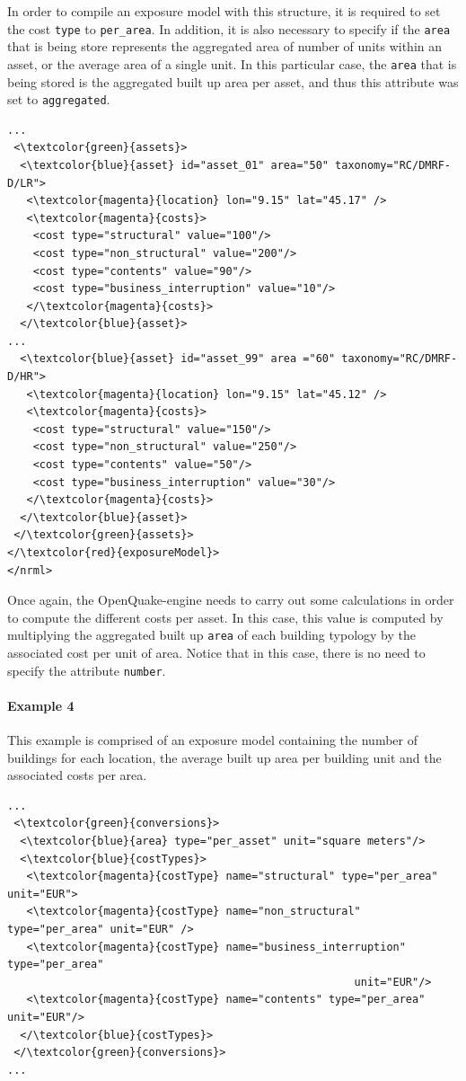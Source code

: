 In order to compile an \gls{exposure model} with this structure, it is required to set the cost \Verb+type+ to \Verb+per_area+. In addition, it is also necessary to specify if the \Verb+area+ that is being store represents the aggregated area of number of units within an asset, or the average area of a single unit. In this particular case, the \Verb+area+ that is being stored is the aggregated built up area per asset, and thus this attribute was set to \Verb+aggregated+.

\begin{Verbatim}[frame=single, commandchars=\\\{\}, samepage=false]
...
 <\textcolor{green}{assets}>
  <\textcolor{blue}{asset} id="asset_01" area="50" taxonomy="RC/DMRF-D/LR">
   <\textcolor{magenta}{location} lon="9.15" lat="45.17" />
   <\textcolor{magenta}{costs}>
    <cost type="structural" value="100"/>
    <cost type="non_structural" value="200"/>
    <cost type="contents" value="90"/>
    <cost type="business_interruption" value="10"/>
   </\textcolor{magenta}{costs}>
  </\textcolor{blue}{asset}>
...
  <\textcolor{blue}{asset} id="asset_99" area ="60" taxonomy="RC/DMRF-D/HR">
   <\textcolor{magenta}{location} lon="9.15" lat="45.12" />
   <\textcolor{magenta}{costs}>
    <cost type="structural" value="150"/>
    <cost type="non_structural" value="250"/>
    <cost type="contents" value="50"/>
    <cost type="business_interruption" value="30"/>
   </\textcolor{magenta}{costs}>
  </\textcolor{blue}{asset}>
 </\textcolor{green}{assets}>
</\textcolor{red}{exposureModel}>
</nrml>
\end{Verbatim}

Once again, the OpenQuake-engine needs to carry out some calculations in order to compute the different costs per asset. In this case, this value is computed by multiplying the aggregated built up \Verb+area+ of each building typology by the associated cost per unit of area. Notice that in this case, there is no need to specify the attribute \Verb+number+.

\paragraph{Example 4}
This example is comprised of an \gls{exposure model} containing the number of buildings for each location, the average built up area per building unit and the associated costs per area.

\begin{Verbatim}[frame=single, commandchars=\\\{\}, samepage=false]
...
 <\textcolor{green}{conversions}>
  <\textcolor{blue}{area} type="per_asset" unit="square meters"/>
  <\textcolor{blue}{costTypes}>
   <\textcolor{magenta}{costType} name="structural" type="per_area" unit="EUR">
   <\textcolor{magenta}{costType} name="non_structural" type="per_area" unit="EUR" />
   <\textcolor{magenta}{costType} name="business_interruption" type="per_area" 
                                                      unit="EUR"/>
   <\textcolor{magenta}{costType} name="contents" type="per_area" unit="EUR"/>
  </\textcolor{blue}{costTypes}>
 </\textcolor{green}{conversions}>
...
\end{Verbatim}

